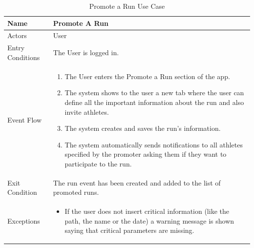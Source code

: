 \begin{enumerate}
\FloatBarrier
\begin{table}[h]
\begin{tabular}{|p{3.4cm}|p{}|}
\hline
Name             & Promote A Run \\ \hline
Actors           & User  \\ \hline
Entry Conditions & The User is logged in.    \\ \hline
Event Flow       & \begin{enumerate}
            \item The User enters the Promote a Run section of the app.
            \item The system shows to the user a new tab where the user can define all the important information about the run and also invite athletes.
            \item The system creates and saves the run's information.
            \item The system automatically sends notifications to all athletes specified by the promoter asking them if they want to participate to the run.
        \end{enumerate}\\ \hline
Exit Condition   & The run event has been created and added to the list of promoted runs.\\ \hline
Exceptions       & \begin{itemize}
\item If the user does not insert critical information (like the path, the name or the date) a warning message is shown saying that critical parameters are missing.
\end{itemize}\\ \hline
\end{tabular}
\caption{Promote a Run Use Case}
\end{table}
\FloatBarrier


\end{enumerate}
